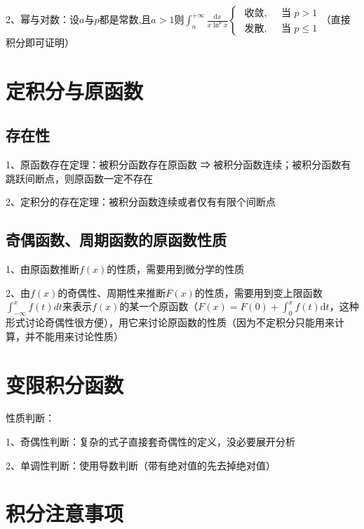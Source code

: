 2、幂与对数：设$a$与$p$都是常数,且$a>1$则$\int_{a}^{+\infty} \frac{\mathrm{d} x}{x \ln ^{p} x} \begin{cases}\text { 收敛, } & \text { 当 } p>1 \\ \text { 发散, } & \text { 当 } p \leqslant 1\end{cases}$（直接积分即可证明）

\section{定积分与原函数}



\subsection{存在性}

1、原函数存在定理：被积分函数存在原函数 ⇒ 被积分函数连续；被积分函数有跳跃间断点，则原函数一定不存在

2、定积分的存在定理：被积分函数连续或者仅有有限个间断点



\subsection{奇偶函数、周期函数的原函数性质}

1、由原函数推断$f(x)$的性质，需要用到微分学的性质

2、由$f(x)$的奇偶性、周期性来推断$F(x)$的性质，需要用到变上限函数$\int_{-\infty}^{x}f(t)dt$来表示$f(x)$的某一个原函数（$F(x)=F(0)+\int_{0}^{x} f(t) \mathrm{d} t$，这种形式讨论奇偶性很方便），用它来讨论原函数的性质（因为不定积分只能用来计算，并不能用来讨论性质）

\section{变限积分函数}

性质判断：

1、奇偶性判断：复杂的式子直接套奇偶性的定义，没必要展开分析

2、单调性判断：使用导数判断（带有绝对值的先去掉绝对值）

\section{积分注意事项}

